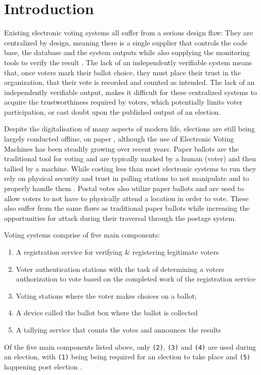 \documentclass{article}
\begin{document}
    \section{Introduction}
Existing electronic voting systems all suffer from a serious design flaw: They are centralized by design, meaning there is a single supplier that controls the code base, the database and the system outputs while also supplying the monitoring tools to verify the result \citep{3_noizat_2016}. The lack of an independently verifiable system means that, once voters mark their ballot choice, they must place their trust in the organization, that their vote is recorded and counted as intended. The lack of an independently verifiable output, makes it difficult for these centralized systems to acquire the trustworthiness required by voters, which potentially limits voter participation, or cast doubt upon the published output of an election.

Despite the digitalisation of many aspects of modern life, elections are still being largely conducted offline, on paper \citep{43_ernest_2014}, although the use of Electronic Voting Machines has been steadily growing over recent years. Paper ballots are the traditional tool for voting and are typically marked by a human (voter) and then tallied by a machine. While costing less than most electronic systems to run they rely on physical security and trust in polling stations to not manipulate and to properly handle them \citep{44_wyndham_chen_das_2016}. Postal votes also utilize paper ballots and are used to allow voters to not have to physically attend a location in order to vote. These also suffer from the same flaws as traditional paper ballots while increasing the opportunities for attack during their traversal through the postage system.

Voting systems comprise of five main components:
\begin{enumerate}
	\item A registration service for verifying \& registering legitimate voters
	\item Voter authentication stations with the task of determining a voters authorization to vote based on the completed work of the registration service
	\item Voting stations where the voter makes choices on a ballot;
	\item A device called the ballot box where the ballot is collected
	\item A tallying service that counts the votes and announces the results
\end{enumerate}
Of the five main components listed above, only \verb|(2)|, \verb|(3)| and \verb|(4)| are used during an election, with \verb|(1)| being being required for an election to take place and \verb|(5)| happening post election \citep{48_safevote_2001}.
\end{document}
